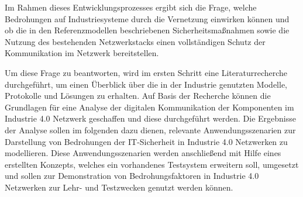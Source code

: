 Im Rahmen dieses Entwicklungsprozesses ergibt sich die Frage, welche Bedrohungen auf Industriesysteme durch die Vernetzung einwirken können und ob die in den Referenzmodellen beschriebenen Sicherheitsmaßnahmen sowie die Nutzung des bestehenden Netzwerkstacks einen vollständigen Schutz der Kommunikation im Netzwerk bereitstellen. 

Um diese Frage zu beantworten, wird im ersten Schritt eine Literaturrecherche durchgeführt, um einen Überblick über die in der Industrie genutzten Modelle, Protokolle und Lösungen zu erhalten. Auf Basis der Recherche können die Grundlagen für eine Analyse der digitalen Kommunikation der Komponenten im Industrie 4.0 Netzwerk geschaffen und diese durchgeführt werden. Die Ergebnisse der Analyse sollen im folgenden dazu dienen, relevante Anwendungsszenarien zur Darstellung von Bedrohungen der \ac{IT}-Sicherheit in Industrie 4.0 Netzwerken zu modellieren. Diese Anwendungsszenarien werden anschließend mit Hilfe eines erstellten Konzepts, welches ein vorhandenes Testsystem erweitern soll, umgesetzt und sollen zur Demonstration von Bedrohungsfaktoren in Industrie 4.0 Netzwerken zur Lehr- und Testzwecken genutzt werden können.